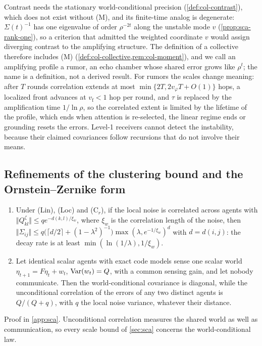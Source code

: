 \begin{remark}\label{rem:sca-rumors}
Contrast needs the stationary world-conditional precision (\cref{def:col-contrast}), which does not exist without \textup{(M)}, and its finite-time analog is degenerate: $\Sigma(t)^{-1}$ has one eigenvalue of order $\rho^{-2t}$ along the unstable mode $v$ (\cref{prop:sca-rank-one}), so a criterion that admitted the weighted coordinate $v$ would assign diverging contrast to the amplifying structure. The definition of a collective therefore includes \textup{(M)} (\cref{def:col-collective,rem:col-moment}), and we call an amplifying profile a rumor, an echo chamber whose shared error grows like $\rho^t$; the name is a definition, not a derived result. For rumors the scales change meaning: after $T$ rounds correlation extends at most $\min\{2T,2v_\varphi T+O(1)\}$ hops, a localized front advances at $v_{\mathrm f}<1$ hop per round, and $\tau$ is replaced by the amplification time $1/\ln\rho$, so the correlated extent is limited by the lifetime of the profile, which ends when attention is re-selected, the linear regime ends or grounding resets the errors. Level-1 receivers cannot detect the instability, because their claimed covariances follow recursions that do not involve their means.
\end{remark}

\subsection{Refinements of the clustering bound and the Ornstein--Zernike form}\label{sup:sca-refinements-of-the-clustering-bound-and}

\begin{proposition}\label{prop:sca-world-conditioning}
\begin{enumerate}
\item[(a)] Under \textup{(Lin)}, \textup{(Loc)} and \textup{(C$_r$)}, if the local noise is correlated across agents with $\Vert Q^\zeta_{kl}\Vert\le qe^{-d(k,l)/\xi_w}$, where $\xi_w$ is the correlation length of the noise, then $\Vert\Sigma_{ij}\Vert\le q\bigl(\lceil d/2\rceil+(1-\lambda^2)^{-1}\bigr)\max(\lambda,e^{-1/\xi_w})^{d}$ with $d=d(i,j)$: the decay rate is at least $\min(\ln(1/\lambda),1/\xi_w)$.
\item[(b)] Let identical scalar agents with exact code models sense one scalar world $\eta_{t+1}=F\eta_t+w_t$, $\operatorname{Var}(w_t)=Q$, with a common sensing gain, and let nobody communicate. Then the world-conditional covariance is diagonal, while the unconditional correlation of the errors of any two distinct agents is $Q/(Q+q)$, with $q$ the local noise variance, whatever their distance.
\end{enumerate}
\end{proposition}
Proof in \cref{app:sca}. Unconditional correlation measures the shared world as well as communication, so every scale bound of \cref{sec:sca} concerns the world-conditional law.


